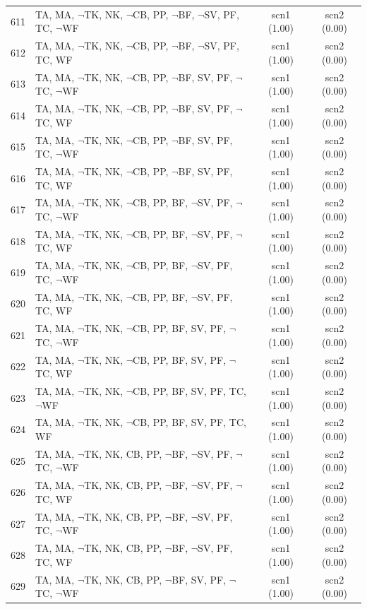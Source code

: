 \documentclass[12pt]{article}
\begin{document}
\begin{longtable}{|l|l|c|c|}
611 & TA, MA, $\neg$TK, NK, $\neg$CB, PP, $\neg$BF, $\neg$SV, PF, TC, $\neg$WF & scn1 (1.00) & scn2 (0.00)\\
612 & TA, MA, $\neg$TK, NK, $\neg$CB, PP, $\neg$BF, $\neg$SV, PF, TC, WF & scn1 (1.00) & scn2 (0.00)\\
613 & TA, MA, $\neg$TK, NK, $\neg$CB, PP, $\neg$BF, SV, PF, $\neg$TC, $\neg$WF & scn1 (1.00) & scn2 (0.00)\\
614 & TA, MA, $\neg$TK, NK, $\neg$CB, PP, $\neg$BF, SV, PF, $\neg$TC, WF & scn1 (1.00) & scn2 (0.00)\\
615 & TA, MA, $\neg$TK, NK, $\neg$CB, PP, $\neg$BF, SV, PF, TC, $\neg$WF & scn1 (1.00) & scn2 (0.00)\\
616 & TA, MA, $\neg$TK, NK, $\neg$CB, PP, $\neg$BF, SV, PF, TC, WF & scn1 (1.00) & scn2 (0.00)\\
617 & TA, MA, $\neg$TK, NK, $\neg$CB, PP, BF, $\neg$SV, PF, $\neg$TC, $\neg$WF & scn1 (1.00) & scn2 (0.00)\\
618 & TA, MA, $\neg$TK, NK, $\neg$CB, PP, BF, $\neg$SV, PF, $\neg$TC, WF & scn1 (1.00) & scn2 (0.00)\\
619 & TA, MA, $\neg$TK, NK, $\neg$CB, PP, BF, $\neg$SV, PF, TC, $\neg$WF & scn1 (1.00) & scn2 (0.00)\\
620 & TA, MA, $\neg$TK, NK, $\neg$CB, PP, BF, $\neg$SV, PF, TC, WF & scn1 (1.00) & scn2 (0.00)\\
621 & TA, MA, $\neg$TK, NK, $\neg$CB, PP, BF, SV, PF, $\neg$TC, $\neg$WF & scn1 (1.00) & scn2 (0.00)\\
622 & TA, MA, $\neg$TK, NK, $\neg$CB, PP, BF, SV, PF, $\neg$TC, WF & scn1 (1.00) & scn2 (0.00)\\
623 & TA, MA, $\neg$TK, NK, $\neg$CB, PP, BF, SV, PF, TC, $\neg$WF & scn1 (1.00) & scn2 (0.00)\\
624 & TA, MA, $\neg$TK, NK, $\neg$CB, PP, BF, SV, PF, TC, WF & scn1 (1.00) & scn2 (0.00)\\
625 & TA, MA, $\neg$TK, NK, CB, PP, $\neg$BF, $\neg$SV, PF, $\neg$TC, $\neg$WF & scn1 (1.00) & scn2 (0.00)\\
626 & TA, MA, $\neg$TK, NK, CB, PP, $\neg$BF, $\neg$SV, PF, $\neg$TC, WF & scn1 (1.00) & scn2 (0.00)\\
627 & TA, MA, $\neg$TK, NK, CB, PP, $\neg$BF, $\neg$SV, PF, TC, $\neg$WF & scn1 (1.00) & scn2 (0.00)\\
628 & TA, MA, $\neg$TK, NK, CB, PP, $\neg$BF, $\neg$SV, PF, TC, WF & scn1 (1.00) & scn2 (0.00)\\
629 & TA, MA, $\neg$TK, NK, CB, PP, $\neg$BF, SV, PF, $\neg$TC, $\neg$WF & scn1 (1.00) & scn2 (0.00)\\

\end{longtable}
\end{document}
